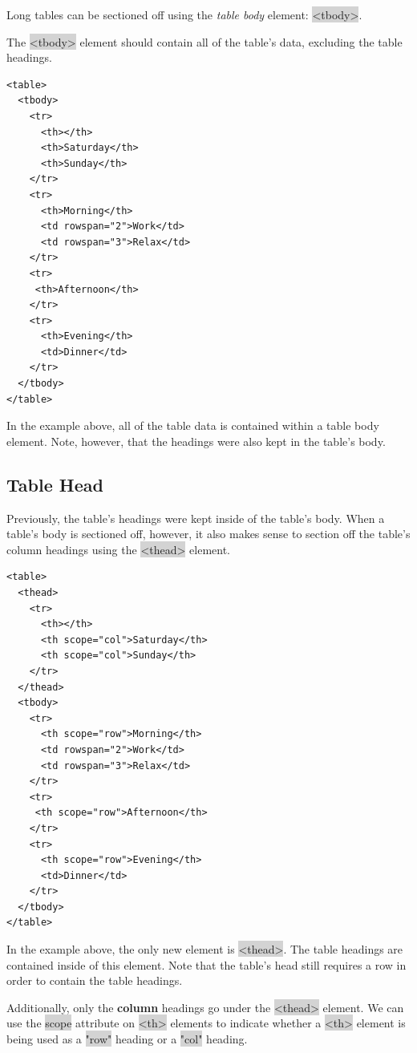 \documentclass[11pt]{article}
\begin{document}
Long tables can be sectioned off using the \textit{table body} element: \colorbox{lightgray}{<tbody>}.

The \colorbox{lightgray}{<tbody>} element should contain all of the table’s data, excluding the table headings.
\begin{lstlisting}
<table>
  <tbody>
    <tr>
      <th></th>
      <th>Saturday</th>
      <th>Sunday</th>
    </tr>
    <tr>
      <th>Morning</th>
      <td rowspan="2">Work</td>
      <td rowspan="3">Relax</td>
    </tr>
    <tr>
     <th>Afternoon</th>
    </tr>
    <tr>
      <th>Evening</th>
      <td>Dinner</td>
    </tr>
  </tbody>
</table>
\end{lstlisting}
In the example above, all of the table data is contained within a table body element. Note, however, that the headings were also kept in the table’s body.

\subsection{Table Head}
Previously, the table’s headings were kept inside of the table’s body. When a table’s body is sectioned off, however, it also makes sense to section off the table’s column headings using the \colorbox{lightgray}{<thead>} element.
\begin{lstlisting}
<table>
  <thead>
    <tr>
      <th></th>
      <th scope="col">Saturday</th>
      <th scope="col">Sunday</th>
    </tr>
  </thead>
  <tbody>
    <tr>
      <th scope="row">Morning</th>
      <td rowspan="2">Work</td>
      <td rowspan="3">Relax</td>
    </tr>
    <tr>
     <th scope="row">Afternoon</th>
    </tr>
    <tr>
      <th scope="row">Evening</th>
      <td>Dinner</td>
    </tr>
  </tbody>
</table>
\end{lstlisting}
In the example above, the only new element is \colorbox{lightgray}{<thead>}. The table headings are contained inside of this element. Note that the table’s head still requires a row in order to contain the table headings.

Additionally, only the \textbf{column} headings go under the \colorbox{lightgray}{<thead>} element. We can use the \colorbox{lightgray}{scope} attribute on \colorbox{lightgray}{<th>} elements to indicate whether a \colorbox{lightgray}{<th>} element is being used as a \colorbox{lightgray}{"row"} heading or a \colorbox{lightgray}{"col"} heading.
\end{document}
